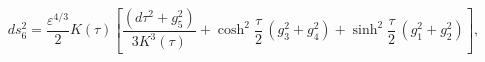 \begin{equation}\label{metricd}
ds_6^2 = \frac{\varepsilon^{4/3}}{2} K(\tau)\left[\frac{(d\tau^2 + g_5^2) }{3 K^3(\tau)}
+ \cosh^2\frac{\tau}{2}\, (g_3^2 +g_4^2)
+ \sinh^2 \frac{\tau}{2} \, (g_1^2 + g_2^2) \right],
\end{equation}

